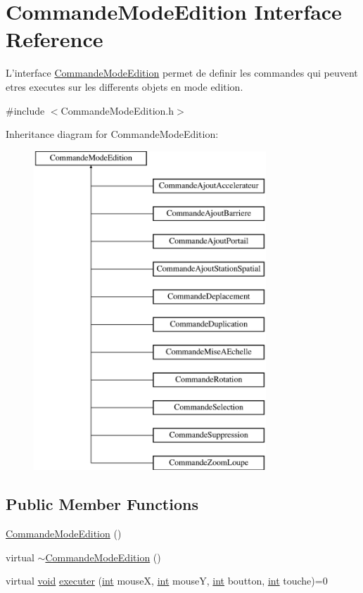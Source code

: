 \hypertarget{class_commande_mode_edition}{\section{Commande\-Mode\-Edition Interface Reference}
\label{class_commande_mode_edition}
}


L'interface \hyperlink{class_commande_mode_edition}{Commande\-Mode\-Edition} permet de definir les commandes qui peuvent etres executes sur les differents objets en mode edition.  




{\ttfamily \#include $<$Commande\-Mode\-Edition.\-h$>$}

Inheritance diagram for Commande\-Mode\-Edition\-:\begin{figure}[H]
\begin{center}
\leavevmode
\includegraphics[height=12.000000cm]{class_commande_mode_edition}
\end{center}
\end{figure}
\subsection*{Public Member Functions}
\begin{DoxyCompactItemize}
\item 
\hyperlink{class_commande_mode_edition_ae6d4fef67683ce568a8c34b7329fd759}{Commande\-Mode\-Edition} ()
\item 
virtual \hyperlink{class_commande_mode_edition_af499078eaf3c840c1abb885c18581221}{$\sim$\-Commande\-Mode\-Edition} ()
\item 
virtual \hyperlink{wglew_8h_aeea6e3dfae3acf232096f57d2d57f084}{void} \hyperlink{class_commande_mode_edition_aca77e9bb8557971af33748041975eecb}{executer} (\hyperlink{wglew_8h_a500a82aecba06f4550f6849b8099ca21}{int} mouse\-X, \hyperlink{wglew_8h_a500a82aecba06f4550f6849b8099ca21}{int} mouse\-Y, \hyperlink{wglew_8h_a500a82aecba06f4550f6849b8099ca21}{int} boutton, \hyperlink{wglew_8h_a500a82aecba06f4550f6849b8099ca21}{int} touche)=0
\end{DoxyCompactItemize}
